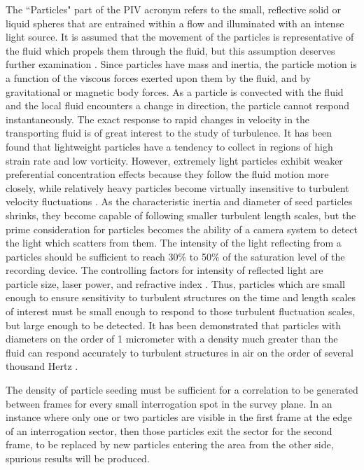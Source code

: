 The ``Particles" part of the PIV acronym refers to the small, reflective solid 
or liquid spheres 
that are entrained within a flow and illuminated with 
an intense light source. It is assumed that 
the movement of the particles is representative of the fluid which propels them 
through the fluid, but this assumption deserves further examination 
\cite{roscoe1952}. Since particles have mass and inertia, the particle motion 
is a function of the viscous forces exerted upon them by the fluid, and by 
gravitational or magnetic body forces. As a particle is convected with the 
fluid and the local fluid encounters a change in direction, the particle cannot 
respond instantaneously. The exact response to rapid changes in velocity in the 
transporting fluid is of great interest to the study of turbulence. It has been 
found that lightweight 
particles have a tendency to collect in regions of high strain rate and low 
vorticity. However, extremely light particles exhibit weaker preferential 
concentration effects because they follow the fluid motion more closely, while 
relatively heavy particles become virtually insensitive to turbulent velocity 
fluctuations \cite{squires1990}. As the characteristic inertia and diameter of 
seed particles shrinks, they 
become capable of following 
smaller turbulent length scales, but the prime consideration for particles 
becomes the ability of a camera system to detect the light which scatters from 
them. The intensity of the light reflecting from a 
particles should be sufficient to reach 30\% to 50\% of the saturation level of 
the recording device. The controlling factors for intensity of reflected light 
are particle size, laser power, and refractive index \cite{adrian2011}. Thus, 
particles which are small enough to ensure sensitivity to turbulent structures 
on the time and length scales of interest must be small enough to respond to 
those turbulent fluctuation scales, but large enough to be detected. It has 
been demonstrated that particles with diameters on the order of 1 micrometer 
with a density much greater than the fluid can respond accurately to turbulent 
structures in air on the order of several thousand Hertz \cite{mei1996}.

The density of particle seeding must be sufficient for a correlation to be 
generated between frames for every small interrogation spot in the survey 
plane. In an instance where only one or two particles are visible in the first 
frame at the edge of an interrogation sector, then those particles exit the 
sector for the second frame, to be replaced by new particles 
entering the area from the other side, spurious results will be produced.


